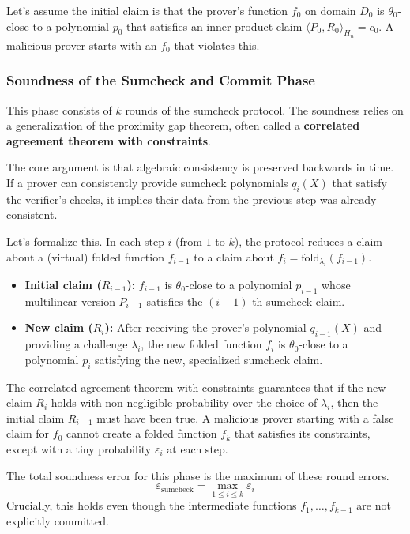 \documentclass{article}
\begin{document}
Let's assume the initial claim is that the prover's function $f_0$ on domain $D_0$ is $\theta_0$-close to a polynomial $p_0$ that satisfies an inner product claim $\langle P_0, R_0 \rangle_{H_n} = c_0$. A malicious prover starts with an $f_0$ that violates this.

\subsubsection{Soundness of the Sumcheck and Commit Phase}
This phase consists of $k$ rounds of the sumcheck protocol. The soundness relies on a generalization of the proximity gap theorem, often called a \textbf{correlated agreement theorem with constraints}.

The core argument is that algebraic consistency is preserved backwards in time. If a prover can consistently provide sumcheck polynomials $q_i(X)$ that satisfy the verifier's checks, it implies their data from the previous step was already consistent.

Let's formalize this. In each step $i$ (from $1$ to $k$), the protocol reduces a claim about a (virtual) folded function $f_{i-1}$ to a claim about $f_i = \text{fold}_{\lambda_i}(f_{i-1})$.
\begin{itemize}
    \item \textbf{Initial claim ($R_{i-1}$):} $f_{i-1}$ is $\theta_0$-close to a polynomial $p_{i-1}$ whose multilinear version $P_{i-1}$ satisfies the $(i-1)$-th sumcheck claim.
    \item \textbf{New claim ($R_i$):} After receiving the prover's polynomial $q_{i-1}(X)$ and providing a challenge $\lambda_i$, the new folded function $f_i$ is $\theta_0$-close to a polynomial $p_i$ satisfying the new, specialized sumcheck claim.
\end{itemize}
The correlated agreement theorem with constraints guarantees that if the new claim $R_i$ holds with non-negligible probability over the choice of $\lambda_i$, then the initial claim $R_{i-1}$ must have been true. A malicious prover starting with a false claim for $f_0$ cannot create a folded function $f_k$ that satisfies its constraints, except with a tiny probability $\varepsilon_i$ at each step.

The total soundness error for this phase is the maximum of these round errors.
\[
\varepsilon_{\text{sumcheck}} = \max_{1 \le i \le k} \varepsilon_i
\]
Crucially, this holds even though the intermediate functions $f_1, \dots, f_{k-1}$ are not explicitly committed.
\end{document}
